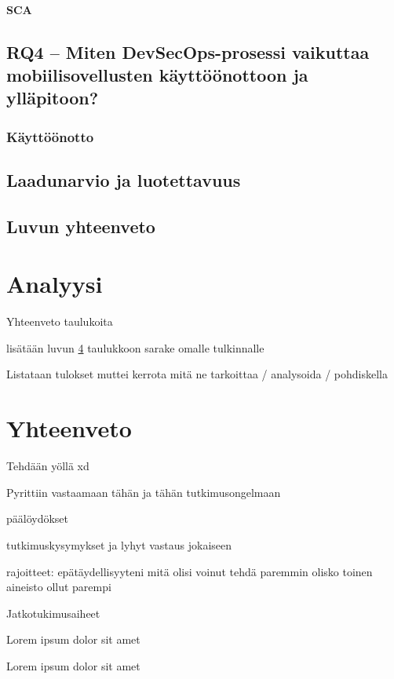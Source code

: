 \documentclass[bscthesis,finnish,oneside,biblatex]{uefcsthesis}
\begin{document}
\subsubsection{SCA}

\section{RQ4 – Miten DevSecOps-prosessi vaikuttaa mobiilisovellusten käyttöönottoon ja ylläpitoon?}
\label{sec:rq4}


\subsection{Käyttöönotto}

\section{Laadunarvio ja luotettavuus}

\section{Luvun yhteenveto}

\chapter{Analyysi}
\label{cha:analyysi}

Yhteenveto taulukoita

lisätään luvun \ref{cha:analyysi} taulukkoon sarake omalle tulkinnalle

Listataan tulokset muttei kerrota mitä ne tarkoittaa / analysoida / pohdiskella


\chapter{Yhteenveto}
\label{cha:yhteenveto}

Tehdään yöllä xd

Pyrittiin vastaamaan tähän ja tähän tutkimusongelmaan

päälöydökset

tutkimuskysymykset ja lyhyt vastaus jokaiseen

rajoitteet:
epätäydellisyyteni
mitä olisi voinut tehdä paremmin
olisko toinen aineisto ollut parempi

Jatkotukimusaiheet

Lorem ipsum dolor sit amet\citep{zafari2019survey}

\citet{zafari2019survey} Lorem ipsum dolor sit amet

\printbibliography[heading=bibintoc]

\backmatter %
\end{document}

